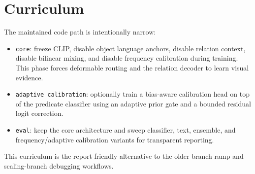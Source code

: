 \documentclass[11pt]{article}
\begin{document}
\begin{table}[h]
\centering
\small
{}
\caption{Current PURE metrics and representative external references. Values are percentages. The strongest current PURE number for mean recall is PredCls mR@50 = 18.80 from the calibrated L3 final checkpoint; the later L3 sweep improves R@50 but lowers mR@50. External rows are included for orientation, not as a direct claim of protocol-matched comparison.}
\label{tab:metrics}
\end{table}

\section{Curriculum}
The maintained code path is intentionally narrow:
\begin{itemize}[leftmargin=1.5em]
  \item \texttt{core}: freeze CLIP, disable object language anchors, disable relation context, disable bilinear mixing, and disable frequency calibration during training. This phase forces deformable routing and the relation decoder to learn visual evidence.
  \item \texttt{adaptive calibration}: optionally train a bias-aware calibration head on top of the predicate classifier using an adaptive prior gate and a bounded residual logit correction.
  \item \texttt{eval}: keep the core architecture and sweep classifier, text, ensemble, and frequency/adaptive calibration variants for transparent reporting.
\end{itemize}
This curriculum is the report-friendly alternative to the older branch-ramp and scaling-branch debugging workflows.
\end{document}
